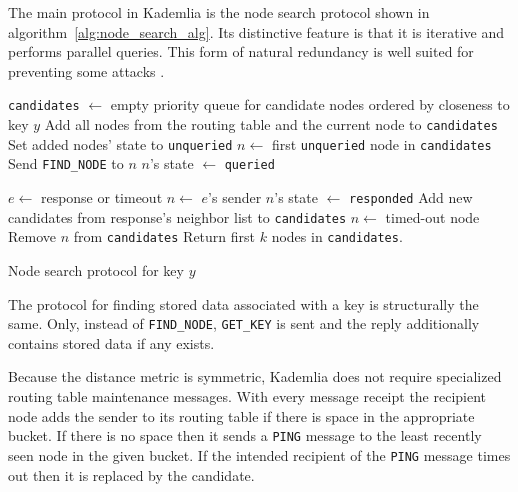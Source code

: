   The main protocol in Kademlia is the node search protocol shown in
  algorithm~\ref{alg:node_search_alg}. Its distinctive feature is that it is
  iterative and performs parallel queries. This form of natural redundancy is
  well suited for preventing some attacks \cite{sit02}.

  \begin{algorithm}
    \begin{algorithmic}[1]
    \STATE \texttt{candidates} $\leftarrow$ empty priority queue for candidate
    nodes ordered by closeness to key $y$
    \STATE Add all nodes from the routing table and the current node to
    \texttt{candidates}
    \STATE Set added nodes' state to \texttt{unqueried}
        \STATE $n \leftarrow$ first \texttt{unqueried} node in
          \texttt{candidates} 
        \STATE Send \texttt{FIND\_NODE} to $n$
        \STATE $n$'s state $\leftarrow$ \texttt{queried}
    \ENDWHILE
      
    \STATE $e \leftarrow$ response or timeout
      \STATE $n \leftarrow$ $e$'s sender
      \STATE $n$'s state $\leftarrow$ \texttt{responded}
      \STATE Add new candidates from response's neighbor list to
      \texttt{candidates}
    \ELSE
      \STATE $n \leftarrow$ timed-out node
      \STATE Remove $n$ from \texttt{candidates}
    \ENDIF
    \ENDWHILE
    \STATE Return first $k$ nodes in \texttt{candidates}.
  \end{algorithmic}
    \caption{Node search protocol for key $y$}
    \label{alg:node_search_alg}
  \end{algorithm}

  The protocol for finding stored data associated with a key is structurally the
  same.
  Only, instead of \texttt{FIND\_NODE}, \texttt{GET\_KEY} is sent and the reply
  additionally contains stored data if any exists.

  Because the distance metric is symmetric, Kademlia does not require
  specialized routing table maintenance messages.
  With every message receipt the recipient node adds the sender to its routing
  table if there is space in the appropriate bucket.
  If there is no space then it sends a \texttt{PING} message to the least
  recently seen node in the given bucket.
  If the intended recipient of the \texttt{PING} message times out then it is
  replaced by the candidate.

